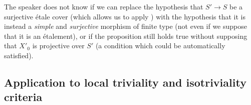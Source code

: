 \begin{remark}\label{fga3.i-b.5-remark}
    The speaker does not know if we can replace the hypothesis that $S'\to S$ be a surjective étale cover (which allows us to apply ) with the hypothesis that it is instead a \emph{simple} and \emph{surjective} morphism of finite type (not even if we suppose that it is an étalement), or if the proposition still holds true without supposing that $X'_0$ is projective over $S'$ (a condition which could be automatically satisfied).
\end{remark}

\subsection{Application to local triviality and isotriviality criteria}\label{fga3.i-b.6}

